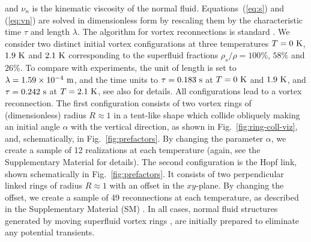 \documentclass[%
 reprint,
 amsmath,amssymb,
 aps,
 prl,
]{revtex4-2}
\begin{document}
and $\nu_n$ is the kinematic viscosity of the normal fluid. 
Equations~(\ref{eq:s}) and (\ref{eq:vn})
are solved in dimensionless form by rescaling them by the characteristic time $\tau$ and length $\lambda$. 
The algorithm for vortex reconnections is standard
\cite{baggaleySensitivityVortexFilament2012a}. We consider two distinct initial vortex configurations
at three temperatures $T=0~\rm K$, $1.9~\rm K$ and $2.1~\rm K$
corresponding to the superfluid fractions $\rho_s/\rho=100 \%$,
$58 \%$ and $26 \%$. To compare with experiments, the unit of length is set to $\lambda=1.59 \times 10^{-4}~\rm m$, and the time units to $\tau=0.183~\rm s$ at $T=0~\rm K$ and $1.9~\rm K$, and $\tau=0.242~\rm s$ at $T=2.1~\rm K$, see also \cite{SeeSupplementaryMaterials} for details.
%
All configurations lead to a vortex reconnection.
The first configuration consists of two vortex rings 
of (dimensionless) radius $R\approx 1$ in a tent-like shape
which collide obliquely 
making an initial angle $\alpha$ with the vertical direction, 
as shown in Fig.~\ref{fig:ring-coll-viz}, and,
schematically, in Fig.~\ref{fig:prefactors}.   
By changing the parameter $\alpha$, we create a sample of 12 realizations
at each temperature (again, see the Supplementary Material 
\cite{SeeSupplementaryMaterials} for details).
The second configuration is the Hopf link, shown schematically in Fig.~\ref{fig:prefactors}. It consists of two perpendicular linked rings of radius $R\approx1$ with an offset in the $xy$-plane.
By changing the offset, we create a sample of 49 reconnections
at each temperature, as described in the Supplementary Material (SM)
\cite{SeeSupplementaryMaterials}.
In all cases, normal fluid structures generated by moving superfluid vortex rings \cite{kivotides-barenghi-samuels-2000}, are initially prepared to eliminate any potential transients.
\end{document}
